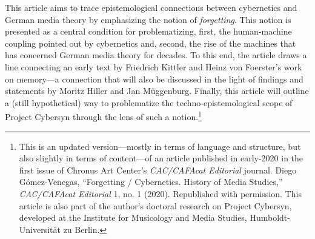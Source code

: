 \documentclass{tufte-handout}
\begin{document}
\begin{titlepage}
This article aims to trace epistemological connections between
cybernetics and German media theory by emphasizing the notion of
\emph{forgetting}. This notion is presented as a central condition for
problematizing, first, the human-machine coupling pointed out by
cybernetics and, second, the rise of the machines that has concerned
German media theory for decades. To this end, the article draws a line
connecting an early text by Friedrich Kittler and Heinz von Foerster's
work on memory---a connection that will also be discussed in the light
of findings and statements by Moritz Hiller and Jan Müggenburg. Finally,
this article will outline a (still hypothetical) way to problematize the
techno-epistemological scope of Project Cybersyn through the lens of
such a notion.\footnote{This is an updated version---mostly in terms of
  language and structure, but also slightly in terms of content---of an
  article published in early-2020 in the first issue of Chronus Art
  Center's \emph{CAC/CAFAcat Editorial} journal. Diego Gómez-Venegas,
  ``Forgetting / Cybernetics. History of Media Studies,''
  \emph{CAC/CAFAcat Editorial} 1, no. 1 (2020). Republished with
  permission. This article is also part of the author's doctoral
  research on Project Cybersyn, developed at the Institute for
  Musicology and Media Studies, Humboldt-Universität zu Berlin.}





\enlargethispage{2\baselineskip}

\vspace*{23em}



 \end{titlepage}
\end{document}
